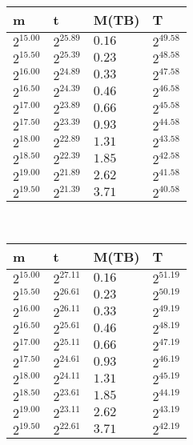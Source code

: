 \begin{tabular}{llll}
m & t & M(TB) & T \\ \hline
$2^{15.00}$ & $2^{25.89}$ & $0.16$ & $2^{49.58}$ \\
$2^{15.50}$ & $2^{25.39}$ & $0.23$ & $2^{48.58}$ \\
$2^{16.00}$ & $2^{24.89}$ & $0.33$ & $2^{47.58}$ \\
$2^{16.50}$ & $2^{24.39}$ & $0.46$ & $2^{46.58}$ \\
$2^{17.00}$ & $2^{23.89}$ & $0.66$ & $2^{45.58}$ \\
$2^{17.50}$ & $2^{23.39}$ & $0.93$ & $2^{44.58}$ \\
$2^{18.00}$ & $2^{22.89}$ & $1.31$ & $2^{43.58}$ \\
$2^{18.50}$ & $2^{22.39}$ & $1.85$ & $2^{42.58}$ \\
$2^{19.00}$ & $2^{21.89}$ & $2.62$ & $2^{41.58}$ \\
$2^{19.50}$ & $2^{21.39}$ & $3.71$ & $2^{40.58}$ \\
\end{tabular}
 \ 
\begin{tabular}{llll}
m & t & M(TB) & T \\ \hline
$2^{15.00}$ & $2^{27.11}$ & $0.16$ & $2^{51.19}$ \\
$2^{15.50}$ & $2^{26.61}$ & $0.23$ & $2^{50.19}$ \\
$2^{16.00}$ & $2^{26.11}$ & $0.33$ & $2^{49.19}$ \\
$2^{16.50}$ & $2^{25.61}$ & $0.46$ & $2^{48.19}$ \\
$2^{17.00}$ & $2^{25.11}$ & $0.66$ & $2^{47.19}$ \\
$2^{17.50}$ & $2^{24.61}$ & $0.93$ & $2^{46.19}$ \\
$2^{18.00}$ & $2^{24.11}$ & $1.31$ & $2^{45.19}$ \\
$2^{18.50}$ & $2^{23.61}$ & $1.85$ & $2^{44.19}$ \\
$2^{19.00}$ & $2^{23.11}$ & $2.62$ & $2^{43.19}$ \\
$2^{19.50}$ & $2^{22.61}$ & $3.71$ & $2^{42.19}$ \\
\end{tabular}
 \ 
